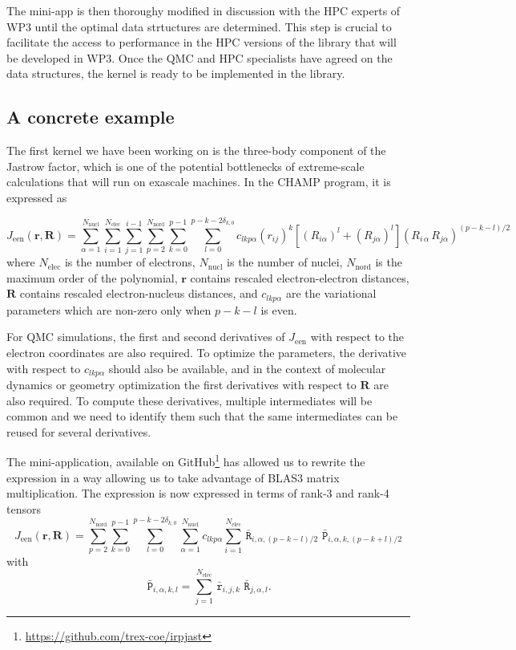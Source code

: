 The mini-app is then thoroughy modified in discussion with the
\ac{HPC} experts of \ac{WP}3 until the optimal data strtuctures are
determined. This step is crucial to facilitate the access to performance
in the \ac{HPC} versions of the library that will be developed in \ac{WP}3.
Once the \ac{QMC} and \ac{HPC} specialists have agreed
on the data structures, the kernel is ready to be implemented in the
library.


\subsection{A concrete example}

The first kernel we have been working on is the three-body component of
the Jastrow factor, which is one of the potential bottlenecks of
extreme-scale calculations that will run on exascale machines.
In the CHAMP program, it is expressed as

\newcommand{\Jeen}{J_{\text{een}}}
\newcommand{\Nel}{N_{\text{elec}}}
\newcommand{\Nat}{N_{\text{nucl}}}
\newcommand{\Nord}{N_{\text{nord}}}
\newcommand{\lmax}{p-k-2\delta_{k,0}}
\newcommand{\br}{\mathbf{r}}
\newcommand{\bR}{\mathbf{R}}
\[
  \Jeen (\br,\bR) = \sum_{\alpha=1}^{\Nat} \sum_{i=1}^{\Nel} \sum_{j=1}^{i-1}
\sum_{p=2}^{\Nord} \sum_{k=0}^{p-1}
\sum_{l=0}^{\lmax} c_{lkp\alpha}
\left( {r}_{ij} \right)^k
\left[ \left( {R}_{i\alpha} \right)^l + \left( {R}_{j\alpha} \right)^l \right]
\left( {R}_{i\,\alpha} \, {R}_{j\alpha} \right)^{(p-k-l)/2} 
\]
where
$\Nel$ is the number of electrons, 
$\Nat$ is the number of nuclei,
$\Nord$ is the maximum order of the polynomial, 
$\br$ contains rescaled electron-electron distances, 
$\bR$ contains rescaled electron-nucleus distances,
and $c_{lkp\alpha}$ are the variational parameters which are non-zero
only when $p-k-l$ is even.

For \ac{QMC} simulations, the first and second derivatives of $\Jeen$ with
respect to the electron coordinates are also required. To optimize the
parameters, the derivative with respect to $c_{lkp\alpha}$
should also be available, and in the context of molecular dynamics or
geometry optimization the first derivatives with respect to $\bR$ are
also required. To compute these derivatives, multiple intermediates
will be common and we need to identify them such that the same
intermediates can be reused for several derivatives.

The mini-application, available on
GitHub\footnote{\url{https://github.com/trex-coe/irpjast}} has allowed us to
rewrite the expression in a way allowing us to take advantage of BLAS3
matrix multiplication. The expression is now expressed in terms of
rank-3 and rank-4 tensors
\newcommand{\tr}{\, \bar{\mathtt{r}}}
\newcommand{\tR}{\, \bar{\mathtt{R}}}
\newcommand{\tP}{\, \bar{\mathtt{P}}}
\[
  \Jeen(\br,\bR) = 
  \sum_{p=2}^{\Nord}\sum_{k=0}^{p-1}
  \sum_{l=0}^{\lmax} 
    \sum_{\alpha=1}^{\Nat}
    c_{lkp\alpha}
    \sum_{i=1}^{\Nel}
    {\tR}_{i,\alpha,(p-k-l)/2}\,
  {\tP}_{i,\alpha,k,(p-k+l)/2}
  \]
with 
  \[
  {\tP}_{i, \alpha, k, l} = \sum_{j=1}^{\Nel} {\tr}_{i,j,k}\,{\tR}_{j,\alpha,l}.
  \]
  
